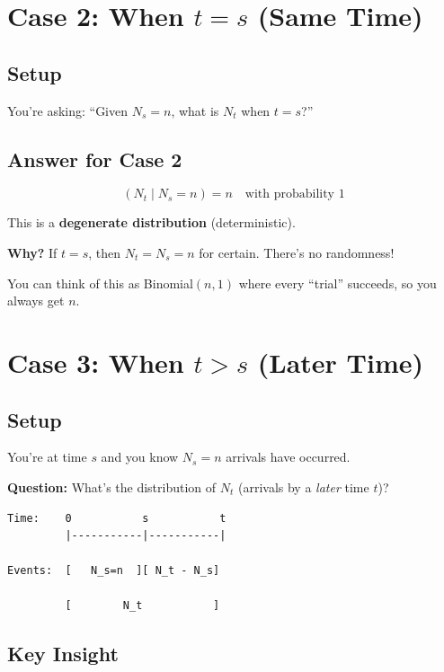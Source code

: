 \documentclass[11pt]{article}
\begin{document}
\section{Case 2: When $t = s$ (Same Time)}

\subsection{Setup}

You're asking: ``Given $N_s = n$, what is $N_t$ when $t = s$?''

\subsection{Answer for Case 2}

\begin{tcolorbox}[colback=blue!10!white,colframe=blue!75!black,title={Case 2: $t = s$}]
\[
\boxed{(N_t \mid N_s = n) = n \quad \text{with probability 1}}
\]

This is a \textbf{degenerate distribution} (deterministic).
\end{tcolorbox}

\textbf{Why?} If $t = s$, then $N_t = N_s = n$ for certain. There's no randomness!

You can think of this as Binomial$(n, 1)$ where every ``trial'' succeeds, so you always get $n$.

\section{Case 3: When $t > s$ (Later Time)}

\subsection{Setup}

You're at time $s$ and you know $N_s = n$ arrivals have occurred.

\textbf{Question:} What's the distribution of $N_t$ (arrivals by a \textit{later} time $t$)?

\begin{verbatim}
Time:    0           s           t
         |-----------|-----------|

Events:  [   N_s=n  ][ N_t - N_s]

         [        N_t           ]
\end{verbatim}

\subsection{Key Insight}
\end{document}
